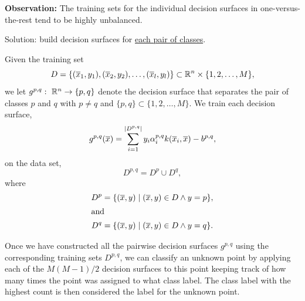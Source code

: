 \documentclass[a4paper,blends,pdf,colorBG,slideColor]{prosper}
\begin{document}
\vspace{.2in}
{\bf Observation:} The training sets for the individual decision surfaces in one-versus-the-rest tend to be highly unbalanced.

\es


\small
Solution: build decision surfaces for \ul{each pair of classes}.

Given the training  set 
\begin{equation*}
D = \{(\overline{x}_1,y_1), (\overline{x}_2,y_2),\ldots,(\overline{x}_l,y_l)\} \subset \mathbb{R}^{n} \times \{1,2,\ldots,M\},
\end{equation*}
we let $g^{p,q}\,\colon\; \mathbb{R}^{n} \rightarrow \{p,q\}$ denote the decision surface
that separates the pair of classes $p$ and $q$  with $p \ne q$ and $\{p,q\} \subset \{1,2,\ldots,M\}$.
We train each decision surface,
\begin{equation*}
g^{p,q}(\overline{x}) = \sum_{i=1}^{{|{D^{p,q}}|}} y_i\alpha_i^{p,q} k(\overline{x}_i,\overline{x}) - b^{p,q},
\end{equation*}
on the data set,
\begin{equation*}
D^{p,q} = D^p \cup D^q,
\end{equation*}
where
\begin{align*}
D^p &= \{ (\overline{x},y) \mid  (\overline{x},y) \in D \wedge y = p\},\\
\intertext{and}
D^q &= \{ (\overline{x},y) \mid  (\overline{x},y) \in D \wedge y = q\}.
\end{align*}
\es


\vspace{.2in}

Once we have constructed all the pairwise decision surfaces $g^{p,q}$ using the
corresponding training sets $D^{p,q}$, we can classify an unknown
point by applying each of the $M(M-1)/2$ decision surfaces to
this point keeping track of how many times the point was assigned to what class label.
The class label with the highest count is then considered the label for the unknown point.

\es
\end{document}
